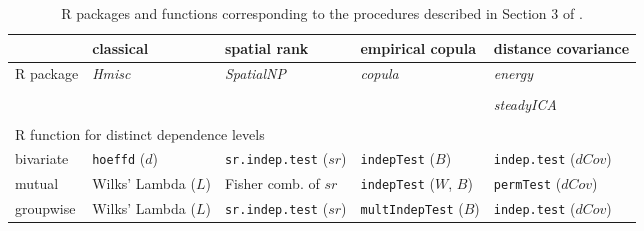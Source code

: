 \documentclass[11pt]{article}
\begin{document}
\begin{table}[ht]
 \caption{\textsf{R} packages and functions corresponding to the procedures described in Section 3 of \cite{HerMax18}. }
\label{tab:Rpack}\small{\centering
  \begin{tabular}{lllll}\toprule
 
   &classical  & spatial rank  &  empirical copula  & distance covariance \\    
		\midrule\midrule
\textsf{R} package& \textit{Hmisc} &\textit{SpatialNP} &\textit{copula} &\textit{energy}  \\
&\citep{Hmisc}&\citep{SpatialNP}&\citep{copula}&\citep{energy}\\
&&&&\textit{steadyICA} \\
&&&&\citep{steadyICA}\\
\midrule
\multicolumn{3}{l}{\textsf{R} function for distinct dependence levels}&&\\
 bivariate &\texttt{hoeffd} ($d$)&\texttt{sr.indep.test} ($sr$)&\texttt{indepTest} ($B$)&\texttt{indep.test} ($dCov$)\\
 mutual &Wilks' Lambda ($L$)& Fisher comb. of $sr$&\texttt{indepTest} ($W$, $B$)&\texttt{permTest} ($dCov$)\\
 groupwise &Wilks' Lambda ($L$)&\texttt{sr.indep.test} ($sr$)&\texttt{multIndepTest} ($B$)&\texttt{indep.test} ($dCov$)\\
  \bottomrule
  \end{tabular}                     }
\end{table}




\end{document}
